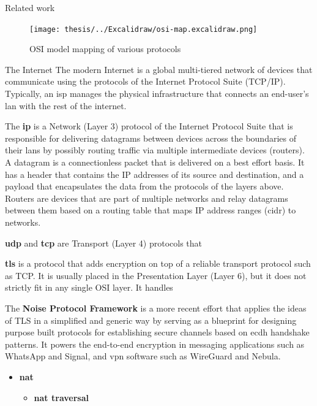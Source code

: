 \begin{frame}[fragile]{Related work}
\newpage

\begin{figure}
\centering
\texttt{[image: thesis/../Excalidraw/osi-map.excalidraw.png]}
\caption{OSI model mapping of various protocols \label{osiMap}}
\end{figure}

\begin{block}{The Internet}
\protect\hypertarget{the-internet}{}
The modern Internet is a global multi-tiered network of devices that
communicate using the protocols of the Internet Protocol Suite (TCP/IP).
Typically, an \gls{isp} manages the physical infrastructure that
connects an end-user's \gls{lan} with the rest of the internet.

The \textbf{\acrfull{ip}} is a Network (Layer 3) protocol of the
Internet Protocol Suite that is responsible for delivering datagrams
between devices across the boundaries of their \glspl{lan} by possibly
routing traffic via multiple intermediate devices (routers). A datagram
is a connectionless packet that is delivered on a best effort basis. It
has a header that contains the IP addresses of its source and
destination, and a payload that encapsulates the data from the protocols
of the layers above. Routers are devices that are part of multiple
networks and relay datagrams between them based on a routing table that
maps IP address ranges (\gls{cidr}) to networks.

\textbf{\acrfull{udp}} and \textbf{\acrfull{tcp}} are Transport (Layer
4) protocols that 

\textbf{\acrfull{tls}} is a protocol that adds encryption on top of a
reliable transport protocol such as TCP. It is usually placed in the
Presentation Layer (Layer 6), but it does not strictly fit in any single
OSI layer. It handles 

The \textbf{Noise Protocol Framework} \autocite{noiseDocs} is a more
recent effort that applies the ideas of TLS in a simplified and generic
way by serving as a blueprint for designing purpose built protocols for
establishing secure channels based on \gls{ecdh} handshake patterns. It
powers the end-to-end encryption in messaging applications such as
WhatsApp and Signal, and \gls{vpn} software such as WireGuard and
Nebula. 

\begin{itemize}
\tightlist
\item
  \textbf{\acrfull{nat}}

  \begin{itemize}
  \tightlist
  \item
    \textbf{\gls{nat} traversal}


\end{itemize}
\end{itemize}
\end{block}
\end{frame}
